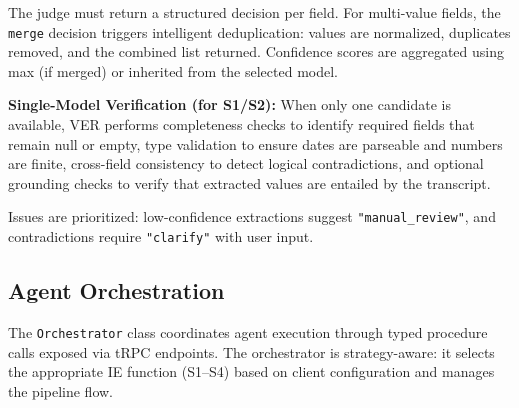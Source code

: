 The judge must return a structured decision per field. For multi-value fields, the \texttt{merge} decision triggers intelligent deduplication: values are normalized, duplicates removed, and the combined list returned. Confidence scores are aggregated using max (if merged) or inherited from the selected model.

\textbf{Single-Model Verification (for S1/S2):} When only one candidate is available, VER performs completeness checks to identify required fields that remain null or empty, type validation to ensure dates are parseable and numbers are finite, cross-field consistency to detect logical contradictions, and optional grounding checks to verify that extracted values are entailed by the transcript.

Issues are prioritized: low-confidence extractions suggest \texttt{"manual\_review"}, and contradictions require \texttt{"clarify"} with user input.


\subsection{Agent Orchestration}
\label{subsec:impl-orchestration}

The \texttt{Orchestrator} class coordinates agent execution through typed procedure calls exposed via tRPC endpoints. The orchestrator is strategy-aware: it selects the appropriate IE function (S1–S4) based on client configuration and manages the pipeline flow.

